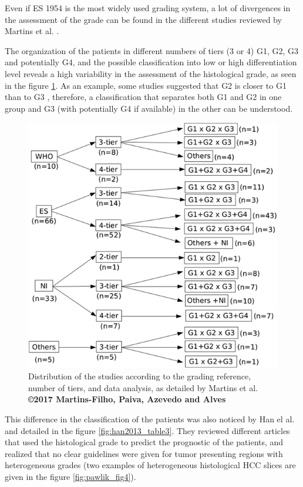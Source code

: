 Even if ES 1954 is the most widely used grading system, a lot of
divergences in the assessment of the grade can be found in the different
studies reviewed by Martins et al. \cite{Martins2017}.

The organization of the patients in different numbers of tiers (3 or 4)
G1, G2, G3 and potentially G4, and the possible classification into low
or high differentiation level reveals a high variability in the
assessment of the histological grade, as seen in the figure \ref{fig:martins2017_figure2}.
As an example, some studies suggested that G2 is closer to G1 than to G3 \cite{Han2013,Zucman-Rossi2015}, therefore, a classification that separates
both G1 and G2 in one group and G3 (with potentially G4 if available) in
the other can be understood.\\


\begin{figure}[th!]
\centering
\includegraphics[width=0.5\linewidth]{images/martins2017_figure2}
\caption{Distribution of the studies according to the grading reference, number of tiers, and data analysis, as detailed by Martins et al. \cite{Martins2017} \textbf{©2017 Martins-Filho, Paiva, Azevedo and Alves}}
\label{fig:martins2017_figure2}
\end{figure}



This difference in the classification of the patients was also noticed
by Han el al. \cite{Han2013} and detailed in the figure \ref{fig:han2013_table3}. They reviewed different articles that used the histological grade to
predict the prognostic of the patients, and realized that no clear
guidelines were given for tumor presenting regions with heterogeneous
grades (two examples of heterogeneous histological HCC slices are given in the figure \ref{fig:pawlik_fig4}).

